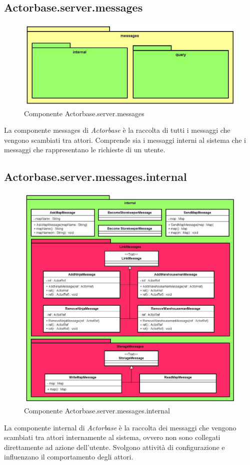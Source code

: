 \documentclass[a4paper]{article}
\begin{document}
	\subsection{Actorbase.server.messages}
		\begin{figure}[H]
			\centering
			\includegraphics[scale=0.5]{Server/messagesLevel.jpg}
			\caption{Componente Actorbase.server.messages}
		\end{figure}
		La componente messages di \emph{Actorbase} è la raccolta di tutti i messaggi che vengono scambiati tra attori. Comprende sia i messaggi interni al sistema che i messaggi che rappresentano le richieste di un utente.
		
	\subsection{Actorbase.server.messages.internal}
		\begin{figure}[H]
			\centering
			\includegraphics[scale=0.5]{Server/internalLevel.jpg}
			\caption{Componente Actorbase.server.messages.internal}
		\end{figure}
		La componente internal di \emph{Actorbase} è la raccolta dei messaggi che vengono scambiati tra attori internamente al sistema, ovvero non sono collegati direttamente ad azione dell'utente. Svolgono attività di configurazione e influenzano il comportamento degli attori.
		
\end{document}
